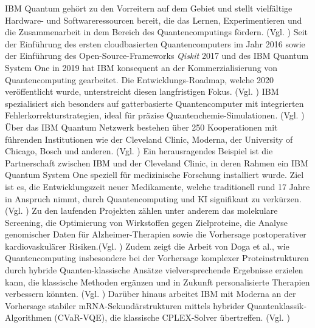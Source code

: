 IBM Quantum gehört zu den Vorreitern auf dem Gebiet und stellt vielfältige Hardware- und Softwareressourcen bereit, die das Lernen, Experimentieren und die Zusammenarbeit in dem Bereich des Quantencomputings fördern. (Vgl. \cite{abughanemIBMQuantumComputers2025}) 
Seit der Einführung des ersten cloudbasierten Quantencomputers im Jahr 2016 sowie der Einführung des Open-Source-Frameworks \textit{Qiskit} 2017 und des IBM Quantum System One in 2019 hat IBM konsequent an der Kommerzialisierung von Quantencomputing gearbeitet. Die Entwicklungs-Roadmap, welche 2020 veröffentlicht wurde, unterstreicht diesen langfristigen Fokus. (Vgl. \cite{jaygambettaIBMRoadmapQuantumcentric2022})
IBM spezialisiert sich besonders auf gatterbasierte Quantencomputer mit integrierten Fehlerkorrekturstrategien, ideal für präzise Quantenchemie-Simulationen. (Vgl. \cite{bravyiHighthresholdLowoverheadFaulttolerant2024, mullerImprovedBeliefPropagation2025})
Über das IBM Quantum Netzwerk bestehen über 250 Kooperationen mit führenden Institutionen wie der Cleveland Clinic, Moderna, der University of Chicago, Bosch und anderen. (Vgl. \cite{noauthor_ibm_nodate})
Ein herausragendes Beispiel ist die Partnerschaft zwischen IBM und der Cleveland Clinic, in deren Rahmen ein IBM Quantum System One speziell für medizinische Forschung installiert wurde. Ziel ist es, die Entwicklungszeit neuer Medikamente, welche traditionell rund 17 Jahre in Anspruch nimmt, durch Quantencomputing und KI signifikant zu verkürzen.(Vgl. \cite{noauthor_cleveland_2023}) Zu den laufenden Projekten zählen unter anderem das molekulare Screening, die Optimierung von Wirkstoffen gegen Zielproteine, die Analyse genomischer Daten für Alzheimer-Therapien sowie die Vorhersage postoperativer kardiovaskulärer Risiken.(Vgl. \cite{flotherHowQuantumComputing2025}) 
Zudem zeigt die Arbeit von Doga et al., wie Quantencomputing insbesondere bei der Vorhersage komplexer Proteinstrukturen durch hybride Quanten-klassische Ansätze vielversprechende Ergebnisse erzielen kann, die klassische Methoden ergänzen und in Zukunft personalisierte Therapien verbessern könnten. (Vgl. \cite{doga_perspective_2024})
Darüber hinaus arbeitet IBM mit Moderna an der Vorhersage stabiler mRNA-Sekundärstrukturen mittels hybrider Quantenklassik-Algorithmen (CVaR-VQE), die klassische CPLEX-Solver übertreffen. (Vgl. \cite{hou_lipid_2021})\\

